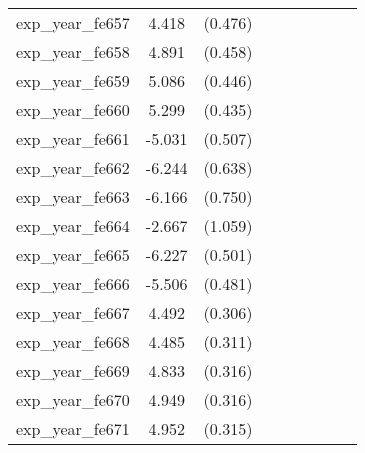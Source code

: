 {\begin{tabular}{l*{4}{cc}}
exp\_year\_fe657&    4.418\sym{***}&  (0.476)&                  &         &                  &         &                  &         \\
exp\_year\_fe658&    4.891\sym{***}&  (0.458)&                  &         &                  &         &                  &         \\
exp\_year\_fe659&    5.086\sym{***}&  (0.446)&                  &         &                  &         &                  &         \\
exp\_year\_fe660&    5.299\sym{***}&  (0.435)&                  &         &                  &         &                  &         \\
exp\_year\_fe661&   -5.031\sym{***}&  (0.507)&                  &         &                  &         &                  &         \\
exp\_year\_fe662&   -6.244\sym{***}&  (0.638)&                  &         &                  &         &                  &         \\
exp\_year\_fe663&   -6.166\sym{***}&  (0.750)&                  &         &                  &         &                  &         \\
exp\_year\_fe664&   -2.667\sym{*}  &  (1.059)&                  &         &                  &         &                  &         \\
exp\_year\_fe665&   -6.227\sym{***}&  (0.501)&                  &         &                  &         &                  &         \\
exp\_year\_fe666&   -5.506\sym{***}&  (0.481)&                  &         &                  &         &                  &         \\
exp\_year\_fe667&    4.492\sym{***}&  (0.306)&                  &         &                  &         &                  &         \\
exp\_year\_fe668&    4.485\sym{***}&  (0.311)&                  &         &                  &         &                  &         \\
exp\_year\_fe669&    4.833\sym{***}&  (0.316)&                  &         &                  &         &                  &         \\
exp\_year\_fe670&    4.949\sym{***}&  (0.316)&                  &         &                  &         &                  &         \\
exp\_year\_fe671&    4.952\sym{***}&  (0.315)&                  &         &                  &         &                  &         \\

\end{tabular}}
